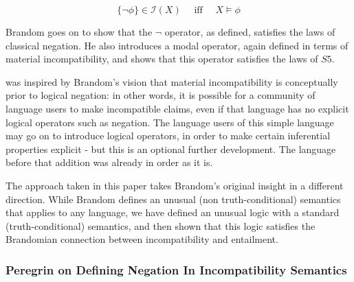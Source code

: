\[
   \{\neg \phi\} \in \mathcal{I}(X)\quad \text{ iff }\quad X \models \phi
\]

\NI Brandom goes on to show that the $\neg$ operator, as defined, satisfies
the laws of classical negation.  He also introduces a modal operator,
again defined in terms of material incompatibility, and shows that
this operator satisfies the laws of $S5$.

\Cathoristic{} was inspired by Brandom's vision that material
incompatibility is conceptually prior to logical negation: in other
words, it is possible for a community of language users to make incompatible claims, even if that
language has no explicit logical operators such as negation.  The
language users of this simple language may go on to introduce logical
operators, in order to make certain inferential properties explicit -
but this is an optional further development.  The language before that
addition was already in order as it is.

The approach taken in this paper takes Brandom's original insight in a
different direction.  While Brandom defines an unusual (non
truth-conditional) semantics that applies to any language, we have
defined an unusual logic with a standard (truth-conditional) semantics, and then shown that this logic satisfies the Brandomian connection between incompatibility and entailment.

\subsubsection{Peregrin on Defining Negation In Incompatibility Semantics}\label{peregrin}

